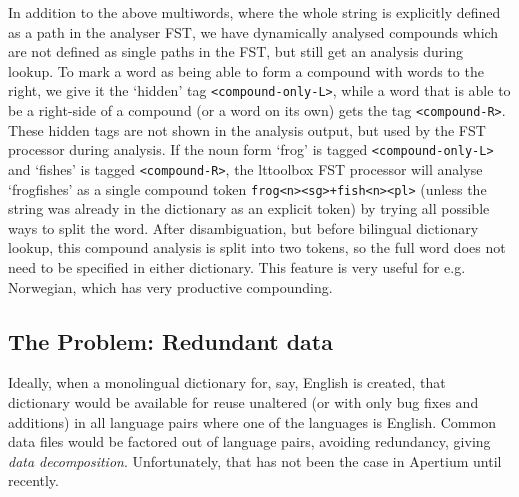 \documentclass[10pt, a4paper]{article}
\newcommand{\ana}[1]{\texttt{#1}}
\newcommand{\f}[1]{`#1'}
\begin{document}
In addition to the above multiwords, where the whole string is
explicitly defined as a path in the analyser FST, we have dynamically
analysed compounds which are not defined as single paths in the FST,
but still get an analysis during lookup. To mark a word as being able
to form a compound with words to the right, we give it the \f{hidden}
tag \ana{<compound-only-L>}, while a word that is able to be a
right-side of a compound (or a word on its own) gets the tag
\ana{<compound-R>}. These hidden tags are not shown in the analysis
output, but used by the FST processor during analysis. If the noun
form \f{frog} is tagged \ana{<compound-only-L>} and \f{fishes} is
tagged \ana{<compound-R>}, the lttoolbox FST processor will
analyse \f{frogfishes} as a single compound token
\ana{frog<n><sg>+fish<n><pl>} (unless the string was already in the
dictionary as an explicit token) by trying all possible ways to split
the word. After disambiguation, but before bilingual dictionary
lookup, this compound analysis is split into two tokens, so the full
word does not need to be specified in either dictionary. This feature
is very useful for e.g. Norwegian, which has very productive
compounding.

\subsection{The Problem: Redundant data}
\label{sec:problem}

Ideally, when a monolingual dictionary for, say, English is created,
that dictionary would be available for reuse unaltered (or with only
bug fixes and additions) in all language pairs where one of the
languages is English. Common data files would be factored out of
language pairs, avoiding redundancy, giving \emph{data decomposition}.
Unfortunately, that has not been the case in Apertium until recently.
\end{document}
